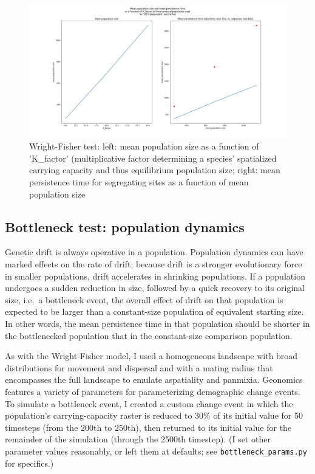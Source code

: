 ﻿\documentclass{article}
\begin{document}
\begin{figure}[h!]
\includegraphics[width=175mm]{./img/validation/wf/pop_size_vs_K_factor_and_mean_persist_t_vs_pop_size.png}
        \caption{Wright-Fisher test: left: mean population size as a function of 'K\_factor' (multiplicative factor determining a species' spatialized carrying capacity and thus equilibrium population size; right: mean persistence time for segregating sites as a function of mean population size}
\end{figure}


\subsection{Bottleneck test: population dynamics}
Genetic drift is always operative in a population. Population dynamics can have
marked effects on the rate of drift; because drift is a stronger evolutionary
force in smaller populations, drift accelerates in shrinking populations. If a
population undergoes a sudden reduction in size, followed by a quick recovery to
its original size, i.e.\ a bottleneck event, the overall effect of drift on
that population is expected to be larger than a constant-size population of equivalent
starting size. In other words, the mean persistence time in that population
should be shorter in the bottlenecked population that in the constant-size comparison
population.

As with the Wright-Fisher model, I used a homogeneous landscape with broad distributions
for movement and dispersal and with a mating radius that encompasses the full landscape
to emulate aspatiality and panmixia. Geonomics features a variety of parameters for
parameterizing demographic change events. To simulate a bottleneck event,
I created a custom change event in which the population's carrying-capacity raster
is reduced to 30\% of its initial value for 50 timesteps (from the 200th to 250th),
then returned to its initial value for the remainder of the simulation
(through the 2500th timestep).
(I set other parameter values reasonably, or left them at defaults;
see \texttt{bottleneck\_params.py} for specifics.)
\end{document}
